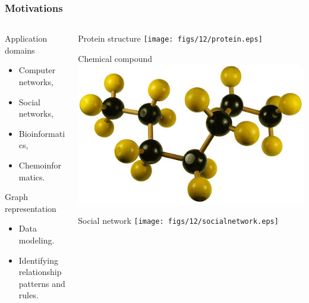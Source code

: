 \begin{frame}
\frametitle{Motivations}

 \begin{columns}
 \begin{column}{0.4\textwidth}
\begin{exampleblock}{Application domains}
\begin{itemize}
\item Computer networks,
\item Social networks,
\item Bioinformatics,
\item Chemoinformatics.
\end{itemize}
\end{exampleblock}

 \begin{block}{Graph representation}
\begin{itemize}
\item Data modeling. %
\item Identifying relationship patterns and rules.
\end{itemize}

\end{block}
\end{column}
\begin{column}{0.6\textwidth}
\tiny{Protein structure} \texttt{[image: figs/12/protein.eps]}

\tiny{Chemical compound} \includegraphics[scale=0.2]{figs/12/chemical.eps}

\tiny{Social network} \texttt{[image: figs/12/socialnetwork.eps]}
 \end{column}

\end{columns}
\end{frame}



